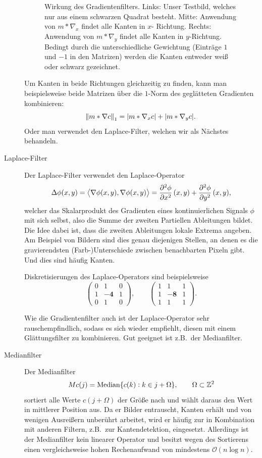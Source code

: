 \begin{example}
\begin{description}
\begin{figure}[ht]
\begin{minipage}{0.3\textwidth}
    \end{minipage}
  \caption{Wirkung des Gradientenfilters. Links: Unser Testbild, welches nur aus einem schwarzen 
    Quadrat besteht. Mitte: Anwendung von $ m * \nabla_{x} $ findet alle Kanten in $ x $-
    Richtung. Rechts: Anwendung von $ m * \nabla_{y} $ findet alle Kanten in $ y $-Richtung.
    Bedingt durch die unterschiedliche Gewichtung (Einträge $ 1 $ und $ -1 $ in den Matrizen)
    werden die Kanten entweder weiß oder schwarz gezeichnet.}
  \label{fig:Gradient}
  \end{figure}
  Um Kanten in beide Richtungen gleichzeitig zu finden, kann man beispielsweise beide Matrizen über 
  die $ 1 $-Norm des geglätteten Gradienten kombinieren:
  \[
    \norm{m * \nabla c}_{1} = |m * \nabla_{x} c| + |m * \nabla_{y} c|.
  \]
  Oder man verwendet den Laplace-Filter, welchen wir als Nächstes behandeln.
\item [Laplace-Filter] Der Laplace-Filter verwendet den Laplace-Operator
  \[
      \Delta \phi(x,y) 
    = \left\langle \nabla \phi(x,y), \nabla \phi(x,y) \right\rangle
    = \dpd[2]{\phi}{x}(x,y) + \dpd[2]{\phi}{y}(x,y),
  \]
  welcher das Skalarprodukt des Gradienten eines kontinuierlichen Signals $ \phi $ mit sich selbst, 
  also die Summe der zweiten Partiellen Ableitungen bildet. Die Idee dabei ist, dass die zweiten
  Ableitungen lokale Extrema angeben. Am Beispiel von Bildern sind dies genau diejenigen Stellen,
  an denen es die gravierendsten (Farb-)Unterschiede zwischen benachbarten Pixeln gibt. Und dies
  sind häufig Kanten.
  
  Diskretisierungen des Laplace-Operators sind beispielsweise
  \[
    \begin{pmatrix}
      0 & 1 & 0 \\
      1 & \mathbf{-4} & 1 \\
      0 & 1 & 0
    \end{pmatrix}, \qquad
    \begin{pmatrix}
      1 & 1 & 1 \\
      1 & \mathbf{-8} & 1 \\
      1 & 1 & 1
    \end{pmatrix}.
  \]
  
  Wie die Gradientenfilter auch ist der Laplace-Operator sehr rauschempfindlich, sodass es sich
  wieder empfiehlt, diesen mit einem Glättungsfilter zu kombinieren. Gut geeignet ist z.B.\ der
  Medianfilter.
\item [Medianfilter] Der Medianfilter
  \[
    Mc(j) = \operatorname{Median}\{ c(k) : k \in j + \Omega \}, \qquad \Omega \subset \mathbb{Z}^{2}
  \]
  sortiert alle Werte $ c(j + \Omega) $ der Größe nach und wählt daraus den Wert in mittlerer
  Position aus. Da er Bilder entrauscht, Kanten erhält und von wenigen Ausreißern unberührt
  arbeitet, wird er häufig zur in Kombination mit anderen Filtern, z.B.\ zur Kantendetektion, 
  eingesetzt. Allerdings ist der Medianfilter kein linearer Operator und besitzt wegen des 
  Sortierens einen vergleichsweise hohen Rechenaufwand von mindestens $ \mathcal{O}(n \log n) $.
\end{description}
\end{example}